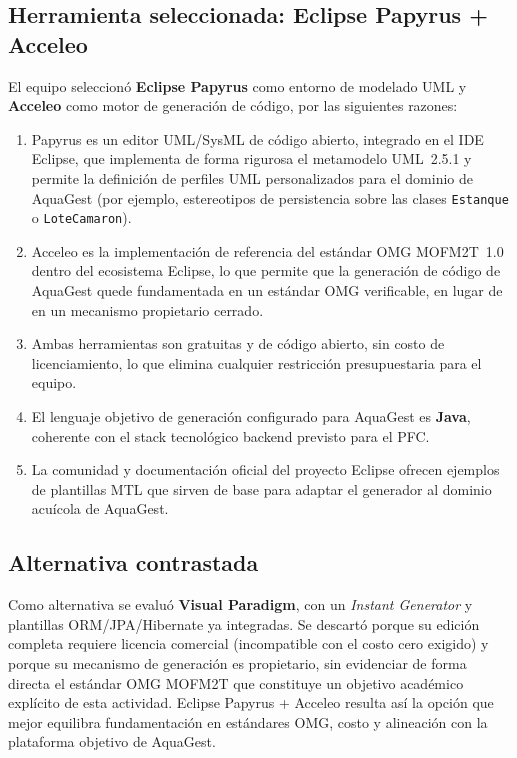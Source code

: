 \documentclass[11pt,a4paper]{article}
\begin{document}
\subsection{Herramienta seleccionada: Eclipse Papyrus + Acceleo}
El equipo seleccionó \textbf{Eclipse Papyrus} \cite{eclipsepapyrus} como entorno de modelado UML y
\textbf{Acceleo} \cite{eclipseacceleo} como motor de generación de código, por las siguientes razones:
\begin{enumerate}[nosep]
  \item Papyrus es un editor UML/SysML de código abierto, integrado en el IDE Eclipse, que
        implementa de forma rigurosa el metamodelo UML~2.5.1 \cite{omg2017uml} y permite la
        definición de perfiles UML personalizados para el dominio de AquaGest (por ejemplo,
        estereotipos de persistencia sobre las clases \texttt{Estanque} o \texttt{LoteCamaron}).
  \item Acceleo es la implementación de referencia del estándar OMG MOFM2T~1.0
        \cite{omg2008mofm2t} dentro del ecosistema Eclipse, lo que permite que la generación de
        código de AquaGest quede fundamentada en un estándar OMG verificable, en lugar de en un
        mecanismo propietario cerrado.
  \item Ambas herramientas son gratuitas y de código abierto, sin costo de licenciamiento, lo que
        elimina cualquier restricción presupuestaria para el equipo.
  \item El lenguaje objetivo de generación configurado para AquaGest es \textbf{Java}, coherente con
        el stack tecnológico backend previsto para el PFC.
  \item La comunidad y documentación oficial del proyecto Eclipse ofrecen ejemplos de plantillas
        MTL que sirven de base para adaptar el generador al dominio acuícola de AquaGest.
\end{enumerate}

\subsection{Alternativa contrastada}
Como alternativa se evaluó \textbf{Visual Paradigm}, con un \textit{Instant Generator} y plantillas
ORM/JPA/Hibernate ya integradas. Se descartó porque su edición completa requiere licencia
comercial (incompatible con el costo cero exigido) y porque su mecanismo de generación es
propietario, sin evidenciar de forma directa el estándar OMG MOFM2T que constituye un objetivo
académico explícito de esta actividad. Eclipse Papyrus + Acceleo resulta así la opción que mejor
equilibra fundamentación en estándares OMG, costo y alineación con la plataforma objetivo de
AquaGest.
\end{document}
